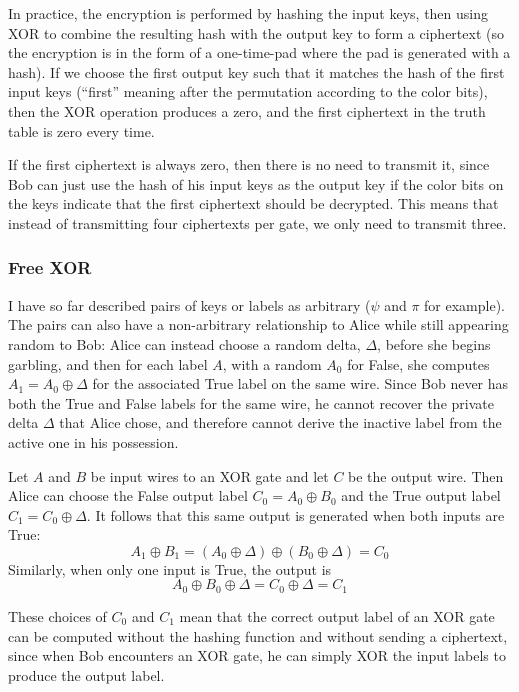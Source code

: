 In practice, the encryption is performed by hashing the input keys, then using XOR to combine the resulting hash with the output key to form a ciphertext (so the encryption is in the form of a one-time-pad where the pad is generated with a hash). If we choose the first output key such that it matches the hash of the first input keys (``first'' meaning after the permutation according to the color bits), then the XOR operation produces a zero, and the first ciphertext in the truth table is zero every time\cite{RowReduction}.

If the first ciphertext is always zero, then there is no need to transmit it, since Bob can just use the hash of his input keys as the output key if the color bits on the keys indicate that the first ciphertext should be decrypted. This means that instead of transmitting four ciphertexts per gate, we only need to transmit three.

\subsubsection{Free XOR}
I have so far described pairs of keys or labels as arbitrary ($\psi$ and $\pi$ for example). The pairs can also have a non-arbitrary relationship to Alice while still appearing random to Bob: Alice can instead choose a random delta, $\Delta$, before she begins garbling, and then for each label $A$, with a random $A_0$ for False, she computes $A_1=A_0\oplus\Delta$ for the associated True label on the same wire\cite{FreeXOR}. Since Bob never has both the True and False labels for the same wire, he cannot recover the private delta $\Delta$ that Alice chose, and therefore cannot derive the inactive label from the active one in his possession.

Let $A$ and $B$ be input wires to an XOR gate and let $C$ be the output wire. Then Alice can choose the False output label $C_0=A_0\oplus B_0$ and the True output label $C_1=C_0\oplus\Delta$. It follows that this same output is generated when both inputs are True: \[A_1\oplus B_1=(A_0\oplus\Delta)\oplus (B_0\oplus\Delta)=C_0\]Similarly, when only one input is True, the output is \[A_0\oplus B_0\oplus\Delta=C_0\oplus\Delta=C_1\]

These choices of $C_0$ and $C_1$ mean that the correct output label of an XOR gate can be computed without the hashing function and without sending a ciphertext, since when Bob encounters an XOR gate, he can simply XOR the input labels to produce the output label\cite{FreeXOR}.

